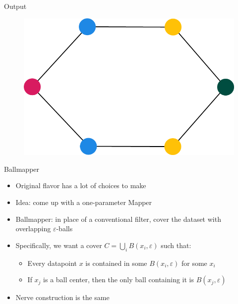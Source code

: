 \documentclass{beamer}
\begin{document}
\begin{frame}{Output}
  \begin{figure}
    \begin{center}
      \includegraphics[width=.8\textwidth]{postermapper.png}
    \end{center}
  \end{figure}
\end{frame}

\begin{frame}{Ballmapper}
  \begin{itemize}
    \item Original flavor has a lot of choices to make
    \item Idea: come up with a one-parameter Mapper
    \item Ballmapper: in place of a conventional filter, cover the dataset with overlapping $\varepsilon$-balls
    \item Specifically, we want a cover $C = \bigcup_i B(x_i, \varepsilon)$ such that:
    \begin{itemize}
      \item Every datapoint $x$ is contained in some $B(x_i, \varepsilon)$ for some $x_i$
      \item If $x_j$ is a ball center, then the only ball containing it is $B(x_j, \varepsilon)$
    \end{itemize}
    \item Nerve construction is the same
  \end{itemize}
  
\end{frame}
\end{document}
